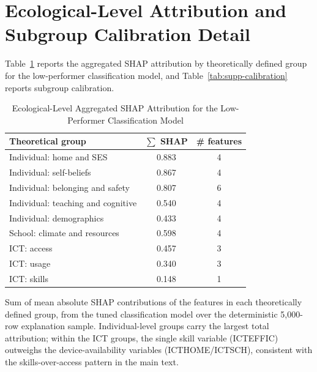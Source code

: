 \documentclass[journal]{IEEEtran}
\begin{document}
\section{Ecological-Level Attribution and Subgroup Calibration Detail}
\label{sec:s6}

Table~\ref{tab:supp-layer} reports the aggregated SHAP attribution by theoretically defined group for the low-performer classification model, and Table~\ref{tab:supp-calibration} reports subgroup calibration.

\begin{table}[!t]
\centering
\caption{Ecological-Level Aggregated SHAP Attribution for the Low-Performer Classification Model}
\label{tab:supp-layer}
\footnotesize
\begin{tabular}{lcc}
\toprule
Theoretical group & $\sum$ SHAP & \# features \\
\midrule
Individual: home and SES & 0.883 & 4 \\
Individual: self-beliefs & 0.867 & 4 \\
Individual: belonging and safety & 0.807 & 6 \\
Individual: teaching and cognitive & 0.540 & 4 \\
Individual: demographics & 0.433 & 4 \\
School: climate and resources & 0.598 & 4 \\
ICT: access & 0.457 & 3 \\
ICT: usage & 0.340 & 3 \\
ICT: skills & 0.148 & 1 \\
\bottomrule
\end{tabular}
\vspace{2pt}
{\footnotesize Sum of mean absolute SHAP contributions of the features in each theoretically defined group, from the tuned classification model over the deterministic 5,000-row explanation sample. Individual-level groups carry the largest total attribution; within the ICT groups, the single skill variable (ICTEFFIC) outweighs the device-availability variables (ICTHOME/ICTSCH), consistent with the skills-over-access pattern in the main text.}
\end{table}
\end{document}
